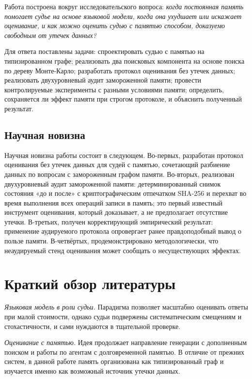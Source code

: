 \documentclass[14pt,a4paper]{extreport}
\begin{document}
Работа построена вокруг исследовательского вопроса: \emph{когда постоянная память помогает судье на основе языковой модели, когда она ухудшает или искажает оценивание, и как можно оценить судью с памятью способом, доказуемо свободным от утечек данных?}

Для ответа поставлены задачи: спроектировать судью с памятью на типизированном графе; реализовать два поисковых компонента на основе поиска по дереву Монте-Карло; разработать протокол оценивания без утечек данных; реализовать двухуровневый аудит замороженной памяти; провести контролируемые эксперименты с разными условиями памяти; определить, сохраняется ли эффект памяти при строгом протоколе, и объяснить полученный результат.

\section{Научная новизна}

Научная новизна работы состоит в следующем. Во-первых, разработан протокол оценивания без утечек данных для судей с памятью, сочетающий разбиение данных по вопросам с замороженным графом памяти. Во-вторых, реализован двухуровневый аудит замороженной памяти: детерминированный снимок состояния «до и после» с криптографическим отпечатком SHA-256 и перехват во время выполнения всех операций записи в память; это первый известный инструмент оценивания, который доказывает, а не предполагает отсутствие утечки. В-третьих, получен корректирующий эмпирический результат: применение аудируемого протокола опровергает ранее правдоподобный вывод о пользе памяти. В-четвёртых, продемонстрировано методологически, что неаудируемый стенд оценивания может сообщать о несуществующих эффектах.

\chapter{Краткий обзор литературы}

\emph{Языковая модель в роли судьи.} Парадигма позволяет масштабно оценивать ответы при малой стоимости, однако судьи подвержены систематическим смещениям и стохастичности, и сами нуждаются в тщательной проверке.

\emph{Оценивание с памятью.} Идея продолжает направление генерации с дополненным поиском и работы по агентам с долговременной памятью. В отличие от прежних систем, в данной работе память организована как типизированный граф и изучается именно как возможный источник утечки данных.
\end{document}
